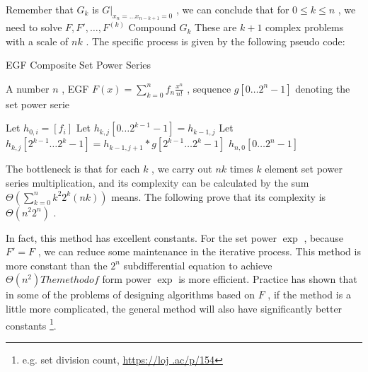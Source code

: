 {Remember that $ G_k $ is $ \left . G \right |_{x_n = \dots x_{n-k+1}=0} $ , we can conclude that for $ 0 \le k \le n $ , we need to solve $ F, F', \dots , F^{(k)} $ Compound $ G_k $ These are $ k + 1 $ complex problems with a scale of $ nk $ . The specific process is given by the following pseudo code:

\begin { breakablealgorithm }
  \caption {EGF Composite Set Power Series}
  \begin { algorithmic }[1]
    \REQUIRE A number $ n $ , EGF $ F(x) = \sum _{k=0}^n f_n \frac {x^n}{n!} $ , sequence $ g[ 0 \dots  2 ^n- 1 ] $ denoting the set power serie

      \STATE Let $ h_{0,i} = [f_i] $
    \ENDFOR
        \STATE Let $ h_{k,j}[ 0 \dots  2 ^{k-1}- 1 ] = h_{k-1,j} $
        \STATE Let $ h_{k,j}[ 2 ^{k-1} \dots  2 ^k- 1 ] = h_{k-1,j+1} * g[ 2 ^{k-1} \dots  2 ^k- 1 ] $
      \ENDFOR
    \ENDFOR
    \RETURN  $ h_{n,0}[ 0 \dots  2 ^n- 1 ] $
  \end { algorithmic }
\end { breakablealgorithm }

The bottleneck is that for each $ k $ , we carry out $ nk $ times $ k $ element set power series multiplication, and its complexity can be calculated by the sum $ \Theta  \left ( \sum _{k=0}^nk^ 2  2 ^k (nk) \right ) $ means. The following prove that its complexity is $ \Theta (n^ 2  2 ^n) $ .

\begin { proof }
After calculation, we can get:
$$
\sum _{k=0)^nk^ 2  2 ^k (nk) = 2 (- 13 + 13  ^n- 3 n- 6  ^n n+ 2 ^nn^ 2 )
$$

Therefore, the complexity of the algorithm is $ \Theta (n^ 2  2 ^n) $ .
\end { proof }

In fact, this method has excellent constants. For the set power $ \exp $ , because $ F'=F $ , we can reduce some maintenance in the iterative process. This method is more constant than the $ 2 ^n $ subdifferential equation to achieve $ \Theta (n ^ 2 ) The method of $ form power $ \exp $ is more efficient. Practice has shown that in some of the problems of designing algorithms based on $ F $ , if the method is a little more complicated, the general method will also have significantly better constants \footnote {e.g. set division count, \url {https://loj .ac/p/154}}.

}
